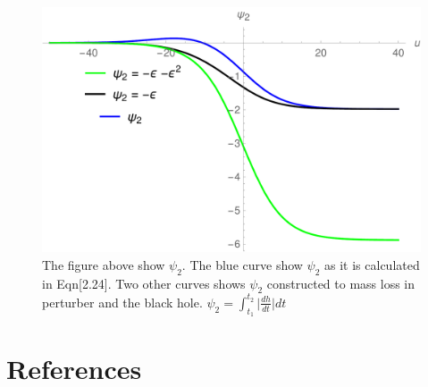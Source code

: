 \documentclass[prd,preprintnumbers,onecolumn,eqsecnum,floatfix,letter]{revtex4}
\begin{document}
\begin{figure}
	\includegraphics[width=5.5in]{../plots/BalanceLawTwosides.pdf}
	\caption{The figure above show $\psi_2$. The blue curve show $\psi_2$ as it is calculated in Eqn[2.24]. Two other curves shows $\psi_2$ constructed to mass loss in perturber and the black hole.
	$\psi_2 = \int_{t_1}^{t_2}\big|\frac{dh}{dt}\big|dt$ }
	\label{fig:RHSvsLHS}
\end{figure}
\section*{References}



\end{document}
